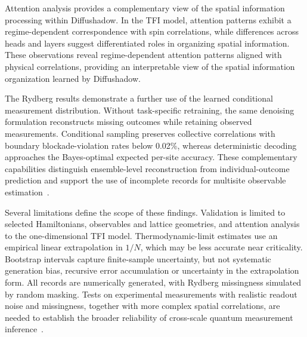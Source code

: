 \documentclass[pdflatex,sn-nature]{sn-jnl}%
\theoremstyle{thmstyleone}%
\theoremstyle{thmstyletwo}%
\theoremstyle{thmstylethree}%
\begin{document}
Attention analysis provides a complementary view of the spatial information processing within Diffushadow. In the TFI model, attention patterns exhibit a regime-dependent correspondence with spin correlations, while differences across heads and layers suggest differentiated roles in organizing spatial information. These observations reveal regime-dependent attention patterns aligned with physical correlations, providing an interpretable view of the spatial information organization learned by Diffushadow.

The Rydberg results demonstrate a further use of the learned conditional measurement distribution. Without task-specific retraining, the same denoising formulation reconstructs missing outcomes while retaining observed measurements. Conditional sampling preserves collective correlations with boundary blockade-violation rates below 0.02\%, whereas deterministic decoding approaches the Bayes-optimal expected per-site accuracy. These complementary capabilities distinguish ensemble-level reconstruction from individual-outcome prediction and support the use of incomplete records for multisite observable estimation~\cite{scholl2023erasure}.

Several limitations define the scope of these findings. Validation is limited to selected Hamiltonians, observables and lattice geometries, and attention analysis to the one-dimensional TFI model. Thermodynamic-limit estimates use an empirical linear extrapolation in $1/N$, which may be less accurate near criticality. Bootstrap intervals capture finite-sample uncertainty, but not systematic generation bias, recursive error accumulation or uncertainty in the extrapolation form. All records are numerically generated, with Rydberg missingness simulated by random masking. Tests on experimental measurements with realistic readout noise and missingness, together with more complex spatial correlations, are needed to establish the broader reliability of cross-scale quantum measurement inference~\cite{maciejewski2020mitigation,kim2022quantum,scholl2023erasure}.
\end{document}

